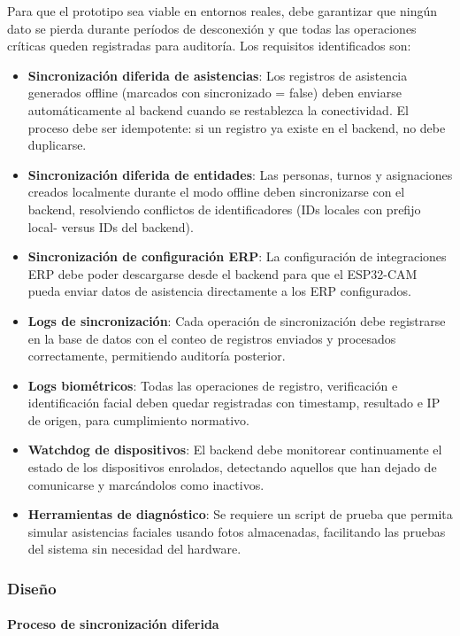 Para que el prototipo sea viable en entornos reales, debe garantizar que ningún dato se pierda durante períodos de desconexión y que todas las operaciones críticas queden registradas para auditoría. Los requisitos identificados son:

\begin{itemize}
    \item \textbf{Sincronización diferida de asistencias}: Los registros de asistencia generados offline (marcados con sincronizado = false) deben enviarse automáticamente al backend cuando se restablezca la conectividad. El proceso debe ser idempotente: si un registro ya existe en el backend, no debe duplicarse.
    \item \textbf{Sincronización diferida de entidades}: Las personas, turnos y asignaciones creados localmente durante el modo offline deben sincronizarse con el backend, resolviendo conflictos de identificadores (IDs locales con prefijo local- versus IDs del backend).
    \item \textbf{Sincronización de configuración ERP}: La configuración de integraciones ERP debe poder descargarse desde el backend para que el ESP32-CAM pueda enviar datos de asistencia directamente a los ERP configurados.
    \item \textbf{Logs de sincronización}: Cada operación de sincronización debe registrarse en la base de datos con el conteo de registros enviados y procesados correctamente, permitiendo auditoría posterior.
    \item \textbf{Logs biométricos}: Todas las operaciones de registro, verificación e identificación facial deben quedar registradas con timestamp, resultado e IP de origen, para cumplimiento normativo.
    \item \textbf{Watchdog de dispositivos}: El backend debe monitorear continuamente el estado de los dispositivos enrolados, detectando aquellos que han dejado de comunicarse y marcándolos como inactivos.
    \item \textbf{Herramientas de diagnóstico}: Se requiere un script de prueba que permita simular asistencias faciales usando fotos almacenadas, facilitando las pruebas del sistema sin necesidad del hardware.
\end{itemize}

\subsubsection{Diseño}

\paragraph{Proceso de sincronización diferida}

